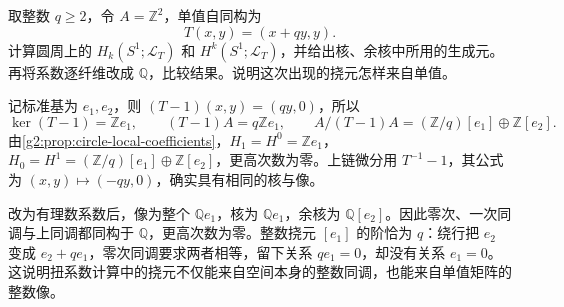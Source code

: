 \begin{exercise}\label{g2:ex:integer-unipotent-circle}
	取整数 \(q\geq2\)，令 \(A=\mathbb Z^2\)，单值自同构为
	\[
		T(x,y)=(x+qy,y).
	\]
	计算圆周上的 \(H_k(S^1;\mathcal L_T)\) 和 \(H^k(S^1;\mathcal L_T)\)，并给出核、余核中所用的生成元。再将系数逐纤维改成 \(\mathbb Q\)，比较结果。说明这次出现的挠元怎样来自单值。
\end{exercise}
\begin{solution}
	记标准基为 \(e_1,e_2\)，则 \((T-1)(x,y)=(qy,0)\)，所以
	\[
		\ker(T-1)=\mathbb Ze_1,\qquad
		(T-1)A=q\mathbb Ze_1,\qquad
		A/(T-1)A=(\mathbb Z/q)[e_1]\oplus\mathbb Z[e_2].
	\]
	由\cref{g2:prop:circle-local-coefficients}，\(H_1=H^0=\mathbb Ze_1\)，\(H_0=H^1=(\mathbb Z/q)[e_1]\oplus\mathbb Z[e_2]\)，更高次数为零。上链微分用 \(T^{-1}-1\)，其公式为 \((x,y)\mapsto(-qy,0)\)，确实具有相同的核与像。

	改为有理数系数后，像为整个 \(\mathbb Qe_1\)，核为 \(\mathbb Qe_1\)，余核为 \(\mathbb Q[e_2]\)。因此零次、一次同调与上同调都同构于 \(\mathbb Q\)，更高次数为零。整数挠元 \([e_1]\) 的阶恰为 \(q\)：绕行把 \(e_2\) 变成 \(e_2+qe_1\)，零次同调要求两者相等，留下关系 \(qe_1=0\)，却没有关系 \(e_1=0\)。这说明扭系数计算中的挠元不仅能来自空间本身的整数同调，也能来自单值矩阵的整数像。
\end{solution}

